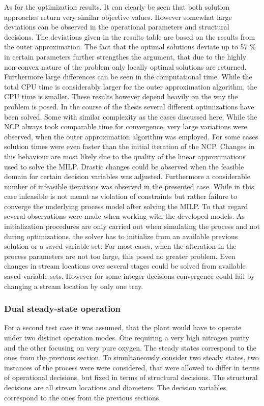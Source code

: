         As for the optimization results. It can clearly be seen that both solution approaches return
        very similar objective values. However somewhat large deviations can be observed in the operational
        parameters and structural decisions. The deviations given in the results table are based on the results
        from the outer approximation. The fact that the optimal solutions deviate up to 57 \% in certain parameters
        further strengthes the argument, that due to the highly non-convex nature of the problem only locally optimal
        solutions are returned. Furthermore large differences can be seen in the computational time. While the
        total CPU time is considerably larger for the outer approximation algorithm, the CPU time is smaller.
        These results however depend heavily on the way the problem is posed. In the course of the thesis several
        different optimizations have been solved. Some with similar complexity as the cases discussed here.
        While the NCP always took comparable time for convergence, very large variations were observed,
        when the outer approximation algorithm was employed. For some cases solution times were even faster
        than the initial iteration of the NCP. Changes in this behaviour are most likely due to the
        quality of the linear approximations used to solve the MILP. Drastic changes could be observed
        when the feasible domain for certain decision variables was adjusted. Furthermore a considerable number
        of infeasible iterations was observed in the presented case. While in this case infeasible is
        not meant as violation of constraints but rather failure to converge the underlying process model after
        solving the MILP. To that regard several observations were made when working with the developed models.
        As initialization procedures are only carried out when simulating the process and not during optimizations,
        the solver has to initialize from an available previous solution or a saved variable set. For most cases,
        when the alteration in the process parameters are not too large, this posed no greater problem. Even changes in stream
        locations over several stages could be solved from available saved variable sets. However for
        some integer decisions convergence could fail by changing a stream location by only one tray.

        \subsubsection{Dual steady-state operation}
        For a second test case it was assumed, that the plant would have to operate under two distinct
        operation modes. One requiring a very high nitrogen purity and the other focusing on very pure oxygen.
        The steady states correspond to the ones from the previous section. To simultaneously consider two steady
        states, two instances of the process were were considered, that were allowed to differ in terms of operational decisions,
        but fixed in terms of structural decisions. The structural decisions are all stream locations and diameters.
        The decision variables correspond to the ones from the previous sections.

